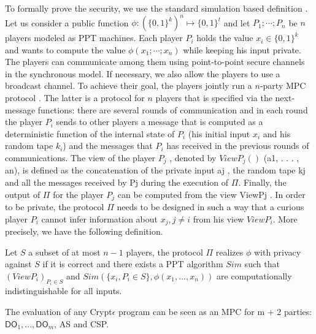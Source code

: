 To formally prove the security, we use the standard simulation based definition \cite{Goldreich}.
Let us consider a public function $\phi: (\{0,1\}^k)^n\mapsto \{0,1\}^t$ and let $P_1; \cdots ; P_n$ be $n$ players modeled
as PPT machines. Each player $P_i$ holds the value $x_i \in \{0,1\}^k$ and wants to compute the
value $\phi(x_1;\cdots ; x_n)$ while keeping his input private. The players can communicate among
them using point-to-point secure channels in the synchronous model. If necessary, we
also allow the players to use a broadcast channel. To achieve their goal, the players jointly
run a $n$-party MPC protocol . The latter is a protocol for $n$ players that is specified via the
next-message functions: there are several rounds of communication and in each round the player $P_i$ sends to other players a message that is computed as a deterministic function
of the internal state of $P_i$ (his initial input $x_i$ and his random tape $k_i$) and the messages
that $P_i$ has received in the previous rounds of communications. The view of the player $P_j$
,
denoted by $ViewP_j()$
(a1, . . . , an), is defined as the concatenation of the private input aj
, the
random tape kj and all the messages received by Pj during the execution of $\Pi$. Finally, the
output of $\Pi$ for the player $P_j$ can be computed from the view ViewPj
. In order to be private,
the protocol $\Pi$ needs to be designed in such a way that a curious player $P_i$ cannot infer
information about $x_j, j \neq i$  from his view $ViewP_i$.
More precisely, we have the following definition.

\begin{definition}  Let $S$ a subset of at most $n - 1$ players, the protocol $\Pi$ realizes $\phi$ with privacy against
$S$ if it is correct and there exists a PPT algorithm $Sim$ such that $(ViewP_i)_{P_i\in S}$ and
$Sim(\{x_i,P_i\in S\} , \phi(x_1, . . . , x_n))$ are computationally indistinguishable for all inputs.
 \end{definition}
The evaluation of any Crypt$\epsilon$ program can  be seen as an MPC for m + 2 parties: $\textsf{DO}_1, . . . , \textsf{DO}_m$, \textsf{AS} and
\textsf{CSP}.

